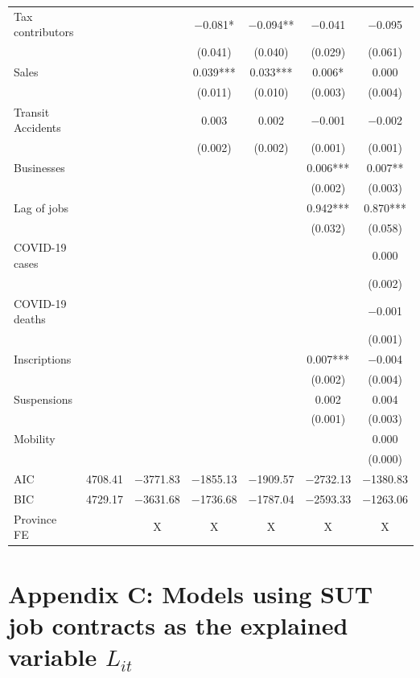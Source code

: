 \documentclass[11pt,a4paper]{article}\usepackage[]{graphicx}\usepackage[]{xcolor}
\begin{document}
\begin{table}[h]
\begin{tabular}[t]{lcccccc}
Tax contributors &  &  & \num{-0.081}* & \num{-0.094}** & \num{-0.041} & \num{-0.095}\\
 &  &  & (\num{0.041}) & (\num{0.040}) & (\num{0.029}) & (\num{0.061})\\
Sales &  &  & \num{0.039}*** & \num{0.033}*** & \num{0.006}* & \num{0.000}\\
 &  &  & (\num{0.011}) & (\num{0.010}) & (\num{0.003}) & (\num{0.004})\\
Transit Accidents &  &  & \num{0.003} & \num{0.002} & \num{-0.001} & \num{-0.002}\\
 &  &  & (\num{0.002}) & (\num{0.002}) & (\num{0.001}) & (\num{0.001})\\
Businesses &  &  &  &  & \num{0.006}*** & \num{0.007}**\\
 &  &  &  &  & (\num{0.002}) & (\num{0.003})\\
Lag of jobs &  &  &  &  & \num{0.942}*** & \num{0.870}***\\
 &  &  &  &  & (\num{0.032}) & (\num{0.058})\\
COVID-19 cases &  &  &  &  &  & \num{0.000}\\
 &  &  &  &  &  & (\num{0.002})\\
COVID-19 deaths &  &  &  &  &  & \num{-0.001}\\
 &  &  &  &  &  & (\num{0.001})\\
Inscriptions &  &  &  &  & \num{0.007}*** & \num{-0.004}\\
 &  &  &  &  & (\num{0.002}) & (\num{0.004})\\
Suspensions &  &  &  &  & \num{0.002} & \num{0.004}\\
 &  &  &  &  & (\num{0.001}) & (\num{0.003})\\
Mobility &  &  &  &  &  & \num{0.000}\\
 &  &  &  &  &  & (\num{0.000})\\
\midrule
AIC & \num{4708.41} & \num{-3771.83} & \num{-1855.13} & \num{-1909.57} & \num{-2732.13} & \num{-1380.83}\\
BIC & \num{4729.17} & \num{-3631.68} & \num{-1736.68} & \num{-1787.04} & \num{-2593.33} & \num{-1263.06}\\
Province FE &  & X & X & X & X & X\\
\bottomrule
\end{tabular}


\end{table}
\clearpage
\section*{Appendix C: Models using SUT job contracts as the explained variable $L_{it}$}
\label{sec:appc}
\renewcommand{\thetable}{C.\arabic{table}}
\setcounter{table}{0} %
\end{document}
